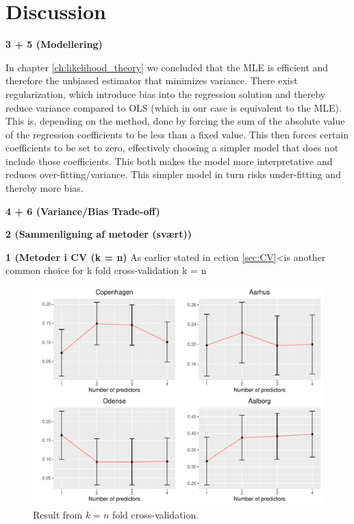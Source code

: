 \chapter{Discussion}

\textbf{3 + 5 (Modellering)}

In chapter \ref{ch:likelihood_theory} we concluded that the MLE is efficient and therefore the unbiased estimator that minimizes variance.
There exist regularization, which introduce bias into the regression solution and thereby reduce variance compared to OLS (which in our case is equivalent to the MLE). 
This is, depending on the method, done by forcing the sum of the absolute value of the regression coefficients to be less than a fixed value.
This then forces certain coefficients to be set to zero, effectively choosing a simpler model that does not include those coefficients.
This both makes the model more interpretative and reduces over-fitting/variance.
This simpler model in turn risks under-fitting and thereby more bias.


\textbf{4 + 6 (Variance/Bias Trade-off)}


\textbf{2 (Sammenligning af metoder (svært))}

\textbf{1 (Metoder i CV (k = n)}
As earlier stated in ection \ref{sec:CV}<is another common choice for k fold cross-validation k = n
\begin{figure}[H]
        \centering
      \includegraphics[width = 0.7 \textwidth]{figures/Nanna/k=n.pdf}
      \caption{Result from $k = n$ fold cross-validation.}
      \label{fig:error_cont}
\end{figure}